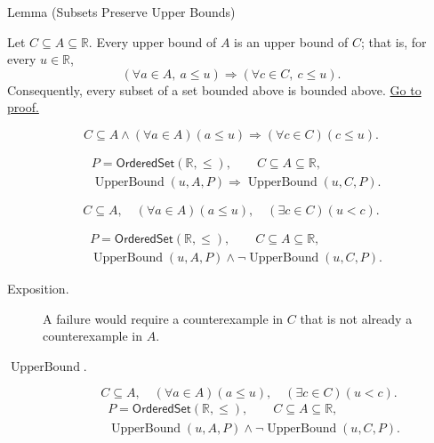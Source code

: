 \begin{lemmabox}{Lemma (Subsets Preserve Upper Bounds)}
\begin{lemma}
\label{lem:subsets-preserve-upper-bounds}
Let $C\subseteq A\subseteq\mathbb{R}$. Every upper bound of $A$ is an
upper bound of $C$; that is, for every $u\in\mathbb{R}$,
\[
\left(\forall a\in A,\ a\leq u\right)
\Longrightarrow
(\forall c\in C,\ c\leq u).
\]
Consequently, every subset of a set bounded above is bounded above.
\hyperref[prf:subsets-preserve-upper-bounds]{Go to proof.}
\end{lemma}
\end{lemmabox}

\begin{remark*}
\[
C\subseteq A\land(\forall a\in A)(a\leq u)
\Longrightarrow
(\forall c\in C)(c\leq u).
\]
\end{remark*}

\begin{remark*}
\[
\begin{aligned}
&P=\mathsf{OrderedSet}(\mathbb{R},\leq),\qquad C\subseteq A\subseteq\mathbb{R},\\
&\operatorname{UpperBound}(u,A,P)
\Longrightarrow \operatorname{UpperBound}(u,C,P).
\end{aligned}
\]
\end{remark*}

\begin{remark*}
\[
C\subseteq A,\quad (\forall a\in A)(a\leq u),\quad
(\exists c\in C)(u<c).
\]
\end{remark*}

\begin{remark*}
\[
\begin{aligned}
&P=\mathsf{OrderedSet}(\mathbb{R},\leq),\qquad C\subseteq A\subseteq\mathbb{R},\\
&\operatorname{UpperBound}(u,A,P)\land\neg\operatorname{UpperBound}(u,C,P).
\end{aligned}
\]
\end{remark*}

\begin{remark*}
\begin{description}
\item[Exposition.]
A failure would require a counterexample in $C$ that is not already a
counterexample in $A$.


  \item[\(\operatorname{UpperBound}.\)]
  \[
C\subseteq A,\quad (\forall a\in A)(a\leq u),\quad
(\exists c\in C)(u<c).
\]
\[
\begin{aligned}
&P=\mathsf{OrderedSet}(\mathbb{R},\leq),\qquad C\subseteq A\subseteq\mathbb{R},\\
&\operatorname{UpperBound}(u,A,P)\land\neg\operatorname{UpperBound}(u,C,P).
\end{aligned}
\]
\end{description}
\end{remark*}

